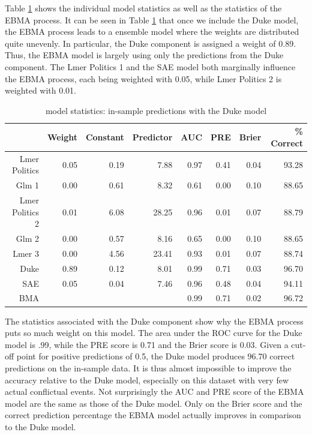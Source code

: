 \documentclass[pdftex,12pt,fullpage,oneside]{amsart}
\begin{document}
Table \ref{InSam2} shows the individual model statistics as well as
the statistics of the EBMA process. It can be seen in Table \ref{InSam2}
that once we include the Duke model, the EBMA process leads to a ensemble model
where the weights are distributed quite unevenly.  In particular, the
Duke component is assigned a weight of 0.89. Thus, the EBMA model is
largely using only the predictions from the Duke component. The Lmer
Politics 1 and the SAE model both marginally influence the EBMA
process, each being weighted with 0.05, while Lmer Politics 2
is weighted with 0.01.

\begin{table}[ht]
\begin{center}
\caption{model statistics: in-sample predictions with the Duke
model}
\label{InSam2}
\begin{tabular}{rrrrrrrr}
  \hline
& Weight & Constant & Predictor & AUC & PRE & Brier & \% Correct
\\
  \hline
Lmer Politics & 0.05 & 0.19 & 7.88 & 0.97 & 0.41 & 0.04 & 93.28
\\
  Glm 1 & 0.00 & 0.61 & 8.32 & 0.61 & 0.00 & 0.10 & 88.65 \\ 
Lmer Politics 2 & 0.01 & 6.08 & 28.25 & 0.96 & 0.01 & 0.07 &
88.79 \\
  Glm 2 & 0.00 & 0.57 & 8.16 & 0.65 & 0.00 & 0.10 & 88.65 \\ 
  Lmer 3 & 0.00 & 4.56 & 23.41 & 0.93 & 0.01 & 0.07 & 88.74 \\ 
  Duke & 0.89 & 0.12 & 8.01 & 0.99 & 0.71 & 0.03 & 96.70 \\ 
  SAE & 0.05 & 0.04 & 7.46 & 0.96 & 0.48 & 0.04 & 94.11 \\ 
  BMA &  &  &  & 0.99 & 0.71 & 0.02 & 96.72 \\ 
   \hline
\end{tabular}
\end{center}
\end{table}

The statistics associated with the Duke component show why the EBMA
process puts so much weight on this model. The area under the ROC
curve for the Duke model is .99, while the PRE score is 0.71 and the
Brier score is 0.03. Given a cut-off point for positive predictions of
0.5, the Duke model produces 96.70 correct predictions on the
in-sample data. It is thus almost impossible to improve the accuracy
relative to the Duke model, especially on this dataset with very few
actual conflictual events. Not surprisingly the AUC and PRE score of
the EBMA model are the same as those of the Duke model.  Only on the
Brier score and the correct prediction percentage the EBMA model
actually improves in comparison to the Duke model.
\end{document}
